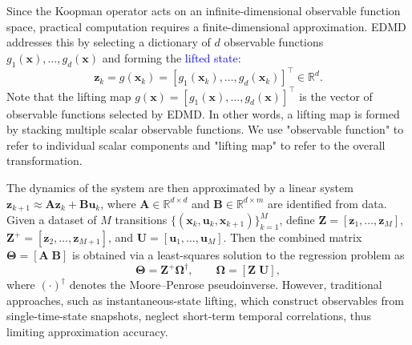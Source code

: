 \documentclass[journal]{IEEEtran}
\newcommand{\vx}{\mathbf{x}}
\newcommand{\vu}{\mathbf{u}}
\newcommand{\vz}{\mathbf{z}}
\newcommand{\mA}{\mathbf{A}}
\newcommand{\mB}{\mathbf{B}}
\newcommand{\mZ}{\mathbf{Z}}
\newcommand{\mU}{\mathbf{U}}
\newcommand{\mTheta}{\boldsymbol{\Theta}}
\newcommand{\mOmega}{\boldsymbol{\Omega}}
\begin{document}
Since the Koopman operator acts on an infinite-dimensional observable function space, practical computation requires a finite-dimensional approximation. EDMD addresses this by selecting a dictionary of $d$ observable functions $g_1(\vx),\ldots,g_d(\vx)$ and forming the \textcolor{blue}{lifted state:}
\begin{equation}
    \vz_k = g(\vx_k) = [g_1(\vx_k), \ldots, g_d(\vx_k)]^\top \in \mathbb{R}^d.
    \label{eq:instantaneous_lifting}
\end{equation}
Note that the lifting map $g(\vx) = [g_1(\vx), \ldots, g_d(\vx)]^\top$ is the vector of observable functions selected by EDMD. In other words, a lifting map is formed by stacking multiple scalar observable functions. We use "observable function" to refer to individual scalar components and "lifting map" to refer to the overall transformation.

The dynamics of the system are then approximated by a linear system $\vz_{k+1} \approx \mA \vz_k + \mB \vu_k$, where $\mA \in \mathbb{R}^{d \times d}$ and $\mB \in \mathbb{R}^{d \times m}$ are identified from data. Given a dataset of $M$ transitions $\{(\vx_k, \vu_k, \vx_{k+1})\}_{k=1}^M$, define $\mZ = [\vz_1, \ldots, \vz_M]$, $\mZ^+ = [\vz_2, \ldots, \vz_{M+1}]$, and $\mU = [\vu_1, \ldots, \vu_M]$. Then the combined matrix $\mTheta = [\mA \; \mB]$ is obtained via a least-squares solution to the regression problem as
\begin{equation}
    \mTheta = \mZ^+ \mOmega^\dagger, \qquad \mOmega = [\mZ \; \mU],
    \label{eq:edmd_regression}
\end{equation}
where $(\cdot)^\dagger$ denotes the Moore--Penrose pseudoinverse. However, traditional approaches, such as instantaneous-state lifting, which construct observables from single-time-state snapshots, neglect short-term temporal correlations, thus limiting approximation accuracy.
\end{document}
